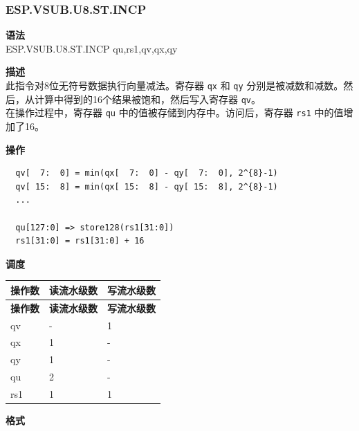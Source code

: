 \newpage
\subsubsection{ESP.VSUB.U8.ST.INCP}\label{instruction:ESPVSUBU8STINCP}
\textbf{语法}\\
ESP.VSUB.U8.ST.INCP qu,rs1,qv,qx,qy

\textbf{描述}\\
此指令对8位无符号数据执行向量减法。寄存器 \lstinline{qx} 和 \lstinline{qy} 分别是被减数和减数。然后，从计算中得到的16个结果被饱和，然后写入寄存器 \lstinline{qv}。\\ 在操作过程中，寄存器 \lstinline{qu} 中的值被存储到内存中。访问后，寄存器 \lstinline{rs1} 中的值增加了16。

\textbf{操作}\\
\begin{lstlisting}
  qv[  7:  0] = min(qx[  7:  0] - qy[  7:  0], 2^{8}-1)
  qv[ 15:  8] = min(qx[ 15:  8] - qy[ 15:  8], 2^{8}-1)
  ...

  qu[127:0] => store128(rs1[31:0])
  rs1[31:0] = rs1[31:0] + 16
\end{lstlisting}

\textbf{调度}\\
\begin{longtable}[c]{|l|l|l|}
    \hline
    \rowcolor{lightgray}
    \textbf{操作数} & \textbf{读流水级数} & \textbf{写流水级数} \\\hline
    \endfirsthead
    \hline
    \rowcolor{lightgray}
     \textbf{操作数} & \textbf{读流水级数} & \textbf{写流水级数} \\\hline
    \endhead
    \hline
    \endfoot

  qv & - & 1 \\\hline
    qx & 1 & - \\\hline
    qy & 1 & - \\\hline
    qu & 2 & - \\\hline
    rs1 & 1 & 1

\end{longtable}

\textbf{格式}\\

